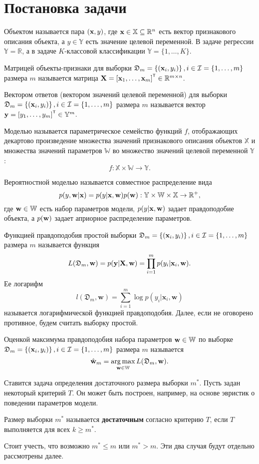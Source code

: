 \section{Постановка задачи}\label{sec1}

Объектом называется пара $(\mathbf{x}, y)$, где $\mathbf{x} \in \mathbb{X} \subseteq \mathbb{R}^n$ есть вектор признакового описания объекта, а $y \in \mathbb{Y}$ есть значение целевой переменной. В задаче регрессии $\mathbb{Y} = \mathbb{R}$, а в задаче $K$-классовой классификации $\mathbb{Y} = \{1, \ldots, K\}$.

Матрицей объекты-признаки для выборки $\mathfrak{D}_m = \left\{ (\mathbf{x}_i, y_i) \right\}, i \in \mathcal{I} = \{ 1, \ldots, m \}$ размера $m$ называется матрица $\bX = \left[ \bx_1, \ldots, \bx_m \right]\T \in \mathbb{R}^{m \times n}$.

Вектором ответов (вектором значений целевой переменной) для выборки $\mathfrak{D}_m = \left\{ (\mathbf{x}_i, y_i) \right\}, i \in \mathcal{I} = \{ 1, \ldots, m \}$ размера $m$ называется вектор $\by = \left[ y_1, \ldots, y_m \right]\T \in \mathbb{Y}^m$.

Моделью называется параметрическое семейство функций $f$, отображающих декартово произведение множества значений признакового описания объектов $\mathbb{X}$ и множества значений параметров $\mathbb{W}$ во множество значений целевой переменной $\mathbb{Y}$: $$f: \mathbb{X} \times \mathbb{W} \to \mathbb{Y}.$$

Вероятностной моделью называется совместное распределение вида $$p(y, \mathbf{w} | \mathbf{x}) = p(y | \mathbf{x}, \mathbf{w}) p(\mathbf{w}): \mathbb{Y} \times \mathbb{W} \times \mathbb{X} \to \mathbb{R}^+,$$
где $\mathbf{w} \in \mathbb{W}$ есть набор параметров модели, $p(y | \mathbf{x}, \mathbf{w})$ задает правдоподобие объекта, а $p(\mathbf{w})$ задает априорное распределение параметров.

Функцией правдоподобия простой выборки $\mathfrak{D}_m = \left\{ (\mathbf{x}_i, y_i) \right\}, i \in \mathcal{I} = \{ 1, \ldots, m \}$ размера $m$ называется функция $$L(\mathfrak{D}_m, \mathbf{w}) = p(\mathbf{y} | \mathbf{X}, \mathbf{w}) = \prod_{i=1}^{m} p(y_i | \mathbf{x}_i, \mathbf{w}).$$ Ее логарифм $$l(\mathfrak{D}_m, \mathbf{w}) = \sum\limits_{i=1}^{m} \log p(y_i | \mathbf{x}_i, \mathbf{w})$$ называется логарифмической функцией правдоподобия. Далее, если не оговорено противное, будем считать выборку простой.

Оценкой максимума правдоподобия набора параметров $\mathbf{w} \in \mathbb{W}$ по выборке $\mathfrak{D}_m = \left\{ (\mathbf{x}_i, y_i) \right\}, i \in \mathcal{I} = \{ 1, \ldots, m \}$ размера $m$ называется $$\hat{\mathbf{w}}_{m} = \operatorname*{arg\,max}_{\mathbf{w} \in \mathbb{W}} L(\mathfrak{D}_m, \mathbf{w}).$$

Ставится задача определения достаточного размера выборки $m^*$. Пусть задан некоторый критерий $T$. Он может быть построен, например, на основе эвристик о поведении параметров модели.
\begin{definition}
    Размер выборки $m^*$ называется \textbf{достаточным} согласно критерию $T$, если $T$ выполняется для всех $k \geqslant m^*$.
\end{definition}
Стоит учесть, что возможно $m^* \leqslant m$ или $m^* > m$. Эти два случая будут отдельно рассмотрены далее.